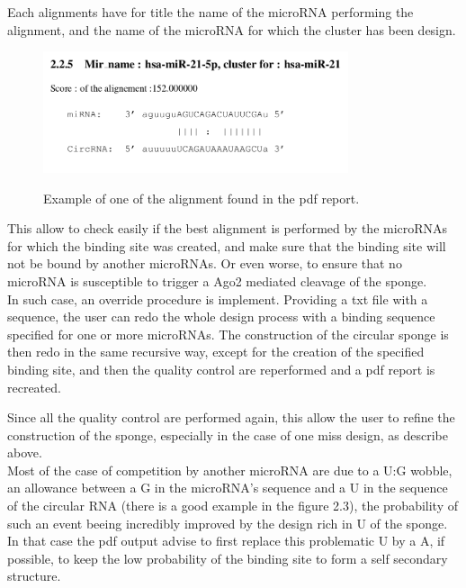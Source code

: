 \documentclass[a4paper,12pt]{report}
\begin{document}
Each alignments have for title the name of the microRNA performing the alignment, and the name of the microRNA for which the cluster has been design. \\
\begin{figure}[H]
	\centering
	{\includegraphics[width=0.8\textwidth]{Capture.png}}
	\caption{Example of one of the alignment found in the pdf report.}
\end{figure}

This allow to check easily if the best alignment is performed by the microRNAs for which the binding site was created, and make sure that the binding site will not be bound by another microRNAs. Or even worse, to ensure that no microRNA is susceptible to trigger a Ago2 mediated cleavage of the sponge.\\

In such case, an override procedure is implement. Providing a txt file with a sequence, the user can redo the whole design process with a binding sequence specified for one or more microRNAs. The construction of the circular sponge is then redo in the same recursive way, except for the creation of the specified binding site, and then the quality control are reperformed and a pdf report is recreated. 


Since all the quality control are performed again, this allow the user to refine the construction of the sponge, especially in the case of one miss design, as describe above.\\

Most of the case of competition by another microRNA are due to a U:G wobble, an allowance between a G in the microRNA's sequence and a U in the sequence of the circular RNA (there is a good example in the figure 2.3), the probability of such an event beeing incredibly improved by the design rich in U of the sponge.\\

In that case the pdf output advise to first replace this problematic U by a A, if possible, to keep the low probability of the binding site to form a self secondary structure.\\
\end{document}
